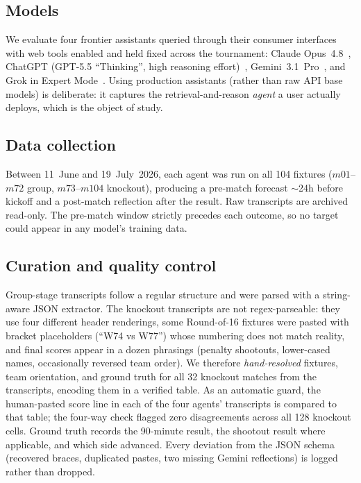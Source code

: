 \documentclass[sigconf,nonacm]{acmart}
\begin{document}
\subsection{Models}
We evaluate four frontier assistants queried through their consumer interfaces
with web tools enabled and held fixed across the tournament: Claude
Opus~4.8~\cite{claude_opus48}, ChatGPT (GPT-5.5 ``Thinking'', high reasoning
effort)~\cite{gpt55}, Gemini~3.1~Pro~\cite{gemini31pro}, and Grok in Expert
Mode~\cite{grok_expert}. Using production assistants (rather than raw API base
models) is deliberate: it captures the retrieval-and-reason \emph{agent} a user
actually deploys, which is the object of study.

\subsection{Data collection}
Between 11~June and 19~July~2026, each agent was run on all 104 fixtures
($m01$--$m72$ group, $m73$--$m104$ knockout), producing a pre-match forecast
$\sim$24h before kickoff and a post-match reflection after the result. Raw
transcripts are archived read-only. The pre-match window strictly precedes each
outcome, so no target could appear in any model's training data.

\subsection{Curation and quality control}
\label{sec:curation}
Group-stage transcripts follow a regular structure and were parsed with a
string-aware JSON extractor. The knockout transcripts are not regex-parseable:
they use four different header renderings, some Round-of-16 fixtures were pasted
with bracket placeholders (``W74 vs W77'') whose numbering does not match
reality, and final scores appear in a dozen phrasings (penalty shootouts,
lower-cased names, occasionally reversed team order). We therefore
\emph{hand-resolved} fixtures, team orientation, and ground truth for all 32 knockout
matches from the transcripts, encoding them in a verified table. As an automatic
guard, the human-pasted score line in each of the four agents' transcripts is
compared to that table; the four-way check flagged zero disagreements across all
128 knockout cells. Ground truth records the 90-minute result, the shootout
result where applicable, and which side advanced. Every deviation from the JSON
schema (recovered braces, duplicated pastes, two missing Gemini reflections) is
logged rather than dropped.
\end{document}
